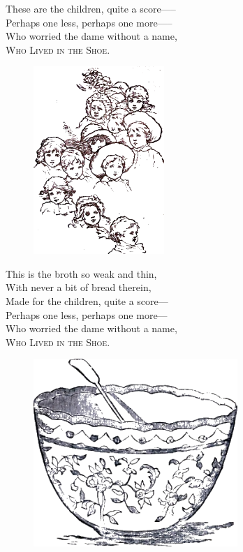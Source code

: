 \documentclass[oneside,12pt,english]{book}
\begin{document}
\pagebreak
These are the children, quite a score—--\\
Perhaps one less, perhaps one more—--\\
Who worried the dame without a name,\\
\textsc{Who Lived in the Shoe}.
\bigskip
\bigskip

\begin{figure}[H]
\centering
\includegraphics[height=2.8in]{fig-03}
\end{figure}

\pagebreak
This is the broth so weak and thin,\\
With never a bit of bread therein,\\
Made for the children, quite a score---\\
Perhaps one less, perhaps one more---\\
Who worried the dame without a name,\\
\textsc{Who Lived in the Shoe}.
\bigskip
\bigskip

\begin{figure}[H]
\centering
\includegraphics[height=2.8in]{fig-04}
\end{figure}
\end{document}
